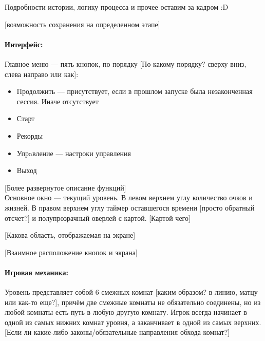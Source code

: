 \documentclass[12pt,a4paper]{article}
\begin{document}
Подробности истории, логику процесса и прочее оставим за кадром :D

{\color{red} [возможность сохранения на определенном этапе]}

\paragraph{Интерфейс:}
Главное меню --- пять кнопок, по порядку {\color{red} [По какому порядку? сверху вниз, слева направо или как]}:
\begin{itemize}
\item Продолжить --- присутствует, если в прошлом запуске была незаконченная сессия. Иначе отсутствует
\item Старт
\item Рекорды
\item Упрaвление --- настроки управления
\item Выход
\end{itemize}

{\color{red} [Более развернутое описание функций]}\\

Основное окно --- текущий уровень. В левом верхнем углу количество очков и жизней. В правом верхнем углу таймер оставшегося времени 
{\color{red} [просто обратный отсчет?]}\ans{[Да.]} и полупрозрачный оверлей с картой. {\color{red} [Картой чего]}

{\color{red} [Какова область, отображаемая на экране]}

{\color{red} [Взаимное расположение кнопок и экрана]}

\paragraph{Игровая механика:}
Уровень представляет собой 6 смежных комнат {\color{red} [каким образом? в линию, матцу или как-то еще?]}, причём две смежные комнаты не обязательно соединены, но из любой комнаты есть путь в любую другую комнату. Игрок всегда начинает в одной из самых нижних комнат уровня, а заканчивает в одной из самых верхних. 
{\color{red} [Если ли какие-либо законы/обязательные направления обхода комнат?]}
\\
\end{document}
